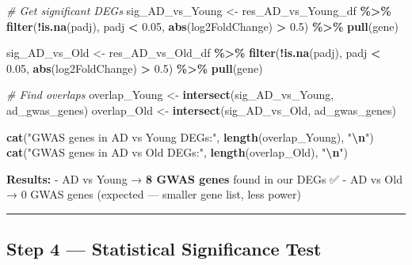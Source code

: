 \documentclass[
]{article}
\newenvironment{Shaded}{\begin{snugshade}}{\end{snugshade}}
\newcommand{\CommentTok}[1]{\textcolor[rgb]{0.56,0.35,0.01}{\textit{#1}}}
\newcommand{\FloatTok}[1]{\textcolor[rgb]{0.00,0.00,0.81}{#1}}
\newcommand{\FunctionTok}[1]{\textcolor[rgb]{0.13,0.29,0.53}{\textbf{#1}}}
\newcommand{\NormalTok}[1]{#1}
\newcommand{\OtherTok}[1]{\textcolor[rgb]{0.56,0.35,0.01}{#1}}
\newcommand{\SpecialCharTok}[1]{\textcolor[rgb]{0.81,0.36,0.00}{\textbf{#1}}}
\newcommand{\StringTok}[1]{\textcolor[rgb]{0.31,0.60,0.02}{#1}}
\begin{document}
\begin{Shaded}
\begin{Highlighting}[]
\CommentTok{\# Get significant DEGs}
\NormalTok{sig\_AD\_vs\_Young }\OtherTok{\textless{}{-}}\NormalTok{ res\_AD\_vs\_Young\_df }\SpecialCharTok{\%\textgreater{}\%}
    \FunctionTok{filter}\NormalTok{(}\SpecialCharTok{!}\FunctionTok{is.na}\NormalTok{(padj), padj }\SpecialCharTok{\textless{}} \FloatTok{0.05}\NormalTok{,}
           \FunctionTok{abs}\NormalTok{(log2FoldChange) }\SpecialCharTok{\textgreater{}} \FloatTok{0.5}\NormalTok{) }\SpecialCharTok{\%\textgreater{}\%}
    \FunctionTok{pull}\NormalTok{(gene)}

\NormalTok{sig\_AD\_vs\_Old }\OtherTok{\textless{}{-}}\NormalTok{ res\_AD\_vs\_Old\_df }\SpecialCharTok{\%\textgreater{}\%}
    \FunctionTok{filter}\NormalTok{(}\SpecialCharTok{!}\FunctionTok{is.na}\NormalTok{(padj), padj }\SpecialCharTok{\textless{}} \FloatTok{0.05}\NormalTok{,}
           \FunctionTok{abs}\NormalTok{(log2FoldChange) }\SpecialCharTok{\textgreater{}} \FloatTok{0.5}\NormalTok{) }\SpecialCharTok{\%\textgreater{}\%}
    \FunctionTok{pull}\NormalTok{(gene)}

\CommentTok{\# Find overlaps}
\NormalTok{overlap\_Young }\OtherTok{\textless{}{-}} \FunctionTok{intersect}\NormalTok{(sig\_AD\_vs\_Young, ad\_gwas\_genes)}
\NormalTok{overlap\_Old   }\OtherTok{\textless{}{-}} \FunctionTok{intersect}\NormalTok{(sig\_AD\_vs\_Old, ad\_gwas\_genes)}

\FunctionTok{cat}\NormalTok{(}\StringTok{"GWAS genes in AD vs Young DEGs:"}\NormalTok{, }\FunctionTok{length}\NormalTok{(overlap\_Young), }\StringTok{"}\SpecialCharTok{\textbackslash{}n}\StringTok{"}\NormalTok{)}
\FunctionTok{cat}\NormalTok{(}\StringTok{"GWAS genes in AD vs Old DEGs:"}\NormalTok{, }\FunctionTok{length}\NormalTok{(overlap\_Old), }\StringTok{"}\SpecialCharTok{\textbackslash{}n}\StringTok{"}\NormalTok{)}
\end{Highlighting}
\end{Shaded}

\textbf{Results:} - AD vs Young → \textbf{8 GWAS genes} found in our
DEGs ✅ - AD vs Old → 0 GWAS genes (expected --- smaller gene list, less
power)

\begin{center}\rule{0.5\linewidth}{0.5pt}\end{center}

\subsection{Step 4 --- Statistical Significance
Test}\label{step-4-statistical-significance-test}
\end{document}
